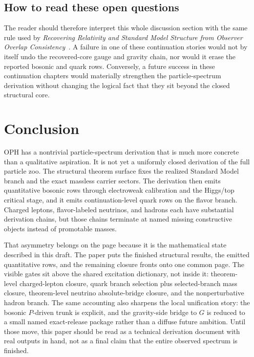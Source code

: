 \documentclass[11pt]{article}
\begin{document}
\subsection{How to read these open questions}

The reader should therefore interpret this whole discussion section with the same rule used by
\emph{Recovering Relativity and Standard Model Structure from Observer Overlap Consistency}~\cite{ophcompact}. A failure in one of these continuation stories would not by itself undo the
recovered-core gauge and gravity chain, nor would it erase the reported bosonic and quark
rows. Conversely, a future success in these continuation chapters would materially strengthen the
particle-spectrum derivation without changing the logical fact that they sit beyond the closed
structural core.

\section{Conclusion}

OPH has a nontrivial
particle-spectrum derivation that is much more concrete than a qualitative aspiration. It is
not yet a uniformly closed derivation of the full particle zoo. The structural theorem surface fixes
the realized Standard Model branch and the exact massless carrier sectors. The derivation
then emits quantitative bosonic rows through electroweak calibration and the Higgs/top critical
stage, and it emits continuation-level quark rows on the flavor branch. Charged leptons,
flavor-labeled neutrinos, and hadrons each have substantial derivation chains, but those chains
terminate at named missing constructive objects instead of promotable masses.

That asymmetry belongs on the page because it is the mathematical state described in
this draft. The paper puts the finished structural results, the emitted quantitative rows, and the
remaining closure fronts onto one common page. The visible gates sit above the shared
excitation dictionary, not inside it: theorem-level charged-lepton closure, quark branch
selection plus selected-branch mass closure, theorem-level neutrino absolute-bridge closure, and
the nonperturbative hadron branch. The same accounting also sharpens the local unification story:
the bosonic \(P\)-driven trunk is explicit, and the gravity-side bridge to \(G\) is reduced to a
small named exact-release package rather than a diffuse future ambition. Until those move, this paper should be read as a technical
derivation document with real outputs in hand, not as a final claim that the entire observed
spectrum is finished.
\end{document}
